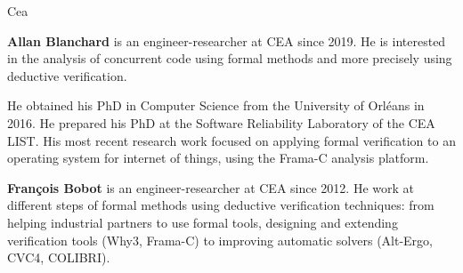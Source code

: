 \begin{sitedescription}{Cea}
\begin{compactitem}
\item{\bf Allan Blanchard} is an engineer-researcher at CEA since 2019. He is
  interested in the analysis of concurrent code using formal methods and more
  precisely using deductive verification.

  He obtained his PhD in Computer Science from the University of Orléans in
  2016. He prepared his PhD at the Software Reliability Laboratory of the CEA
  LIST. His most recent research work focused on applying formal verification to
  an operating system for internet of things, using the Frama-C analysis
  platform.
\item{\bf François Bobot} is an engineer-researcher at CEA since 2012. He work
  at different steps of formal methods using deductive verification techniques:
  from helping industrial partners to use formal tools, designing and extending
  verification tools (Why3, Frama-C) to improving automatic solvers (Alt-Ergo,
  CVC4, COLIBRI).
\end{compactitem}

\end{sitedescription}


